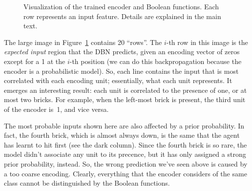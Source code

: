 \begin{figure}[tb]
	\caption{Visualization of the trained encoder and Boolean functions. Each
	row represents an input feature. Details are explained in the main text.}
	\label{fig:breakout-model-all}
\end{figure}
The large image in Figure~\ref{fig:breakout-model-all} contains 20 ``rows''.
The $i$-th row in this image is the \emph{expected input} region that the DBN
predicts, given an encoding vector of zeros except for a 1 at the $i$-th
position (we can do this backpropagation because the encoder is a
probabilistic model). So, each line contains the input that is most
correlated with each encoding unit; essentially, what each unit represents.
It emerges an interesting result: each unit is correlated to the presence of
one, or at most two bricks. For example, when the left-most brick is present,
the third unit of the encoder is~1, and vice versa.

The most probable inputs shown here are also affected by a prior probability.
In fact, the fourth brick, which is almost always down, is the same that the
agent has learnt to hit first (see the dark column). Since the fourth brick is
so rare, the model didn't associate any unit to its precence, but it has only
assigned a strong prior probability, instead. So, the wrong prediction we've
seen above is caused by a too coarse encoding. Clearly, everything that the
encoder considers of the same class cannot be distinguished by the Boolean
functions.

